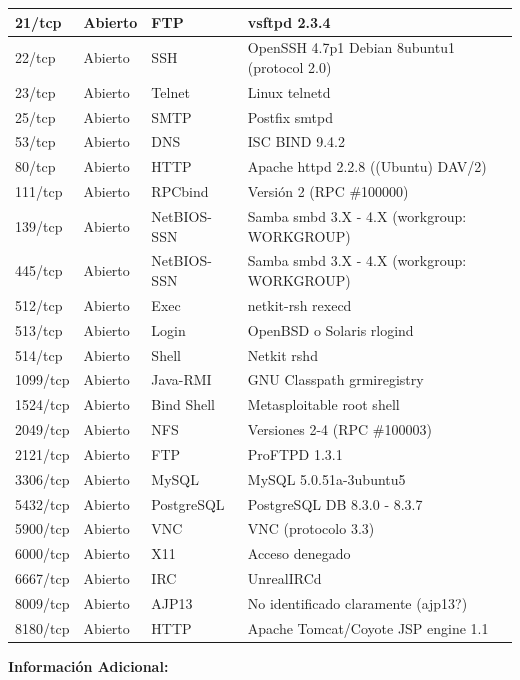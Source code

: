 \documentclass[11pt,oneside,a4paper]{book}
\begin{document}
\begin{table}[H]
\begin{center}
\begin{tabular}{|p{1.5cm}|p{2cm}|p{4cm}|p{5.5cm}|}
21/tcp & Abierto & FTP & vsftpd 2.3.4 \\ \hline
22/tcp & Abierto & SSH & OpenSSH 4.7p1 Debian 8ubuntu1 (protocol 2.0) \\ \hline
23/tcp & Abierto & Telnet & Linux telnetd \\ \hline
25/tcp & Abierto & SMTP & Postfix smtpd \\ \hline
53/tcp & Abierto & DNS & ISC BIND 9.4.2 \\ \hline
80/tcp & Abierto & HTTP & Apache httpd 2.2.8 ((Ubuntu) DAV/2) \\ \hline
111/tcp & Abierto & RPCbind & Versión 2 (RPC \#100000) \\ \hline
139/tcp & Abierto & NetBIOS-SSN & Samba smbd 3.X - 4.X (workgroup: WORKGROUP) \\ \hline
445/tcp & Abierto & NetBIOS-SSN & Samba smbd 3.X - 4.X (workgroup: WORKGROUP) \\ \hline
512/tcp & Abierto & Exec & netkit-rsh rexecd \\ \hline
513/tcp & Abierto & Login & OpenBSD o Solaris rlogind \\ \hline
514/tcp & Abierto & Shell & Netkit rshd \\ \hline
1099/tcp & Abierto & Java-RMI & GNU Classpath grmiregistry \\ \hline
1524/tcp & Abierto & Bind Shell & Metasploitable root shell \\ \hline
2049/tcp & Abierto & NFS & Versiones 2-4 (RPC \#100003) \\ \hline
2121/tcp & Abierto & FTP & ProFTPD 1.3.1 \\ \hline
3306/tcp & Abierto & MySQL & MySQL 5.0.51a-3ubuntu5 \\ \hline
5432/tcp & Abierto & PostgreSQL & PostgreSQL DB 8.3.0 - 8.3.7 \\ \hline
5900/tcp & Abierto & VNC & VNC (protocolo 3.3) \\ \hline
6000/tcp & Abierto & X11 & Acceso denegado \\ \hline
6667/tcp & Abierto & IRC & UnrealIRCd \\ \hline
8009/tcp & Abierto & AJP13 & No identificado claramente (ajp13?) \\ \hline
8180/tcp & Abierto & HTTP & Apache Tomcat/Coyote JSP engine 1.1 \\ \hline

\end{tabular}
\end{center}
\end{table}
\newpage
\textbf{Información Adicional:}
\end{document}
